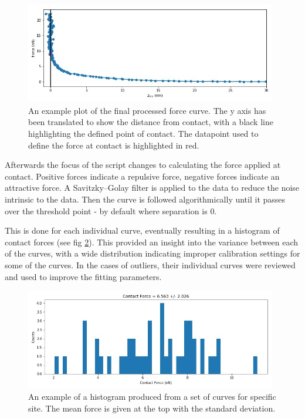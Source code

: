 \begin{figure}[h!!!]     %
        \begin{center}
          \includegraphics[width=110mm]{chapter4/EgFinalCurve.jpg}
\end{center}
\caption{An example plot of the final processed force curve. The y axis has been translated to show the distance from contact, with a black line highlighting the defined point of contact. The datapoint used to define the force at contact is highlighted in red.}
\label{fig:EgFinalCurve}                 %
\end{figure}


Afterwards the focus of the script changes to calculating the force applied at contact. Positive forces indicate a repulsive force, negative forces indicate an attractive force. A Savitzky--Golay filter is applied to the data to reduce the noise intrinsic to the data. \cite{SavitzkyGolay} Then the curve is followed algorithmically until it passes over the threshold point - by default where separation is 0.

This is done for each individual curve, eventually resulting in a histogram of contact forces (see fig \ref{fig:EgForceHisto}). This provided an insight into the variance between each of the curves, with a wide distribution indicating improper calibration settings for some of the curves. In the cases of outliers, their individual curves were reviewed and used to improve the fitting parameters.

\begin{figure}[h!!!] 
        \begin{center}
          \includegraphics[width=110mm]{chapter4/EgForceHisto.jpg}
\end{center}
\caption{An example of a histogram produced from a set of curves for specific site. The mean force is given at the top with the standard deviation.}
\label{fig:EgForceHisto}              
\end{figure}

